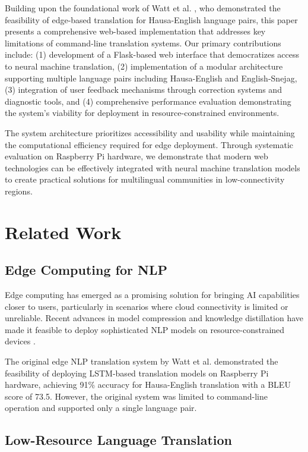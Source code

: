 \documentclass[conference]{IEEEtran}
\begin{document}
Building upon the foundational work of Watt et al. \cite{original-paper}, who demonstrated the feasibility of edge-based translation for Hausa-English language pairs, this paper presents a comprehensive web-based implementation that addresses key limitations of command-line translation systems. Our primary contributions include: (1) development of a Flask-based web interface that democratizes access to neural machine translation, (2) implementation of a modular architecture supporting multiple language pairs including Hausa-English and English-Snejag, (3) integration of user feedback mechanisms through correction systems and diagnostic tools, and (4) comprehensive performance evaluation demonstrating the system's viability for deployment in resource-constrained environments.

The system architecture prioritizes accessibility and usability while maintaining the computational efficiency required for edge deployment. Through systematic evaluation on Raspberry Pi hardware, we demonstrate that modern web technologies can be effectively integrated with neural machine translation models to create practical solutions for multilingual communities in low-connectivity regions.

\section{Related Work}

\subsection{Edge Computing for NLP}

Edge computing has emerged as a promising solution for bringing AI capabilities closer to users, particularly in scenarios where cloud connectivity is limited or unreliable. Recent advances in model compression and knowledge distillation have made it feasible to deploy sophisticated NLP models on resource-constrained devices \cite{edge-nlp-survey}.

The original edge NLP translation system by Watt et al. demonstrated the feasibility of deploying LSTM-based translation models on Raspberry Pi hardware, achieving 91\% accuracy for Hausa-English translation with a BLEU score of 73.5. However, the original system was limited to command-line operation and supported only a single language pair.

\subsection{Low-Resource Language Translation}
\end{document}
